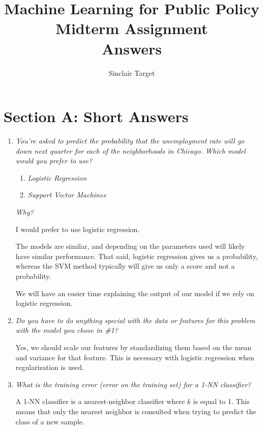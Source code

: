 \documentclass{article}
\title{Machine Learning for Public Policy \\ Midterm Assignment \\ Answers}
\author{Sinclair Target}
\begin{document}
\maketitle

\section*{Section A: Short Answers}
\begin{enumerate}
    \item \textit{You're asked to predict the probability that the unemployment
        rate will go down next quarter for each of the neighborhoods in
        Chicago. Which model would you prefer to use?}

        \begin{enumerate}
            \item \textit{Logistic Regression}
            \item \textit{Support Vector Machines}
        \end{enumerate}

        \textit{Why?}

        I would prefer to use logistic regression.

        The models are similar, and depending on the parameters used will
        likely have similar performance. That said, logistic regression gives
        us a probability, whereas the SVM method typically will give us only a
        score and not a probability.

        We will have an easier time explaining the output of our model if we
        rely on logistic regression.

    \item \textit{Do you have to do anything special with the data or features
        for this problem with the model you chose in \#1?}

        Yes, we should scale our features by standardizing them based on the
        mean and variance for that feature. This is necessary with logistic
        regression when regularization is used.

    \item \textit{What is the training error (error on the training set) for a
        1-NN classifier?}

        A 1-NN classifier is a nearest-neighbor classifier where $k$ is equal
        to 1. This means that only the nearest neighbor is consulted when
        trying to predict the class of a new sample.


\end{enumerate}
\end{document}
